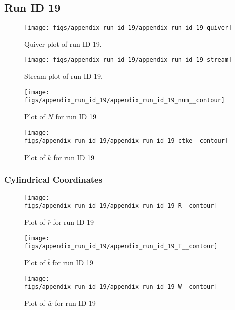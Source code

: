\subsection{Run ID 19}
\begin{figure}[H]
\centering
\texttt{[image: figs/appendix\_run\_id\_19/appendix\_run\_id\_19\_quiver]}
\caption{Quiver plot of run ID 19.}
\label{fig:appendix_run_id_19_quiver}
\end{figure}


\begin{figure}[H]
\centering
\texttt{[image: figs/appendix\_run\_id\_19/appendix\_run\_id\_19\_stream]}
\caption{Stream plot of run ID 19.}
\label{fig:appendix_run_id_19_stream}
\end{figure}


\begin{figure}[H]
\centering
\texttt{[image: figs/appendix\_run\_id\_19/appendix\_run\_id\_19\_num\_\_contour]}
\caption{Plot of $N$ for run ID 19}
\label{fig:appendix_run_id_19_num__contour}
\end{figure}


\begin{figure}[H]
\centering
\texttt{[image: figs/appendix\_run\_id\_19/appendix\_run\_id\_19\_ctke\_\_contour]}
\caption{Plot of $k$ for run ID 19}
\label{fig:appendix_run_id_19_ctke__contour}
\end{figure}


\subsubsection{Cylindrical Coordinates}
\begin{figure}[H]
\centering
\texttt{[image: figs/appendix\_run\_id\_19/appendix\_run\_id\_19\_R\_\_contour]}
\caption{Plot of $\overline{r}$ for run ID 19}
\label{fig:appendix_run_id_19_R__contour}
\end{figure}


\begin{figure}[H]
\centering
\texttt{[image: figs/appendix\_run\_id\_19/appendix\_run\_id\_19\_T\_\_contour]}
\caption{Plot of $\overline{t}$ for run ID 19}
\label{fig:appendix_run_id_19_T__contour}
\end{figure}


\begin{figure}[H]
\centering
\texttt{[image: figs/appendix\_run\_id\_19/appendix\_run\_id\_19\_W\_\_contour]}
\caption{Plot of $\overline{w}$ for run ID 19}
\label{fig:appendix_run_id_19_W__contour}
\end{figure}


